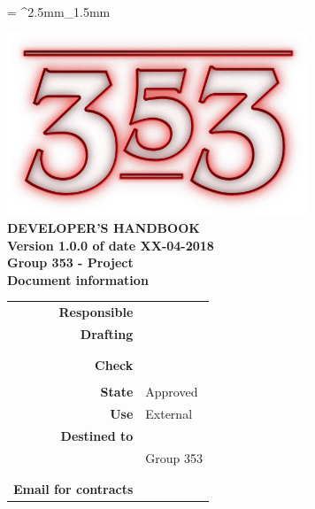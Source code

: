 \documentclass[openany, a4paper, 12pt]{report}
\begin{document}
	
	\tabulinesep = ^2.5mm_1.5mm
	
	\begin{titlepage}
		\centering
		\vfill
		{
			\bfseries
			\vskip2cm
			\includegraphics[width=9cm]{../../common/images/logo.png} \\
			\vfill
			\Huge{DEVELOPER'S HANDBOOK}\\
			\vfill
			\Large Version 1.0.0 of date XX-04-2018\\ 
			\large Group 353 - Project \progetto \\
			\vfill
			\normalsize Document information\\
			\begin{table}[htbp]
				\centering
				\renewcommand\arraystretch{1.2}
				\begin{tabular}{r|l}
					\hline
					\textbf{Responsible}	& \Parwinder \\
					
					\textbf{Drafting} 		& \Elena \\
											& \Gianluca \\
											& \Valentina \\
											
					\textbf{Check} 			& \Riccardo \\	
											& \Davide \\
											
					\textbf{State} 			& Approved\\
					\textbf{Use}			& External\\
					\textbf{Destined to}   	& \Proponente\\
										& Group 353\\
										& \Vardanega\\
										& \Cardin\\
					
					\textbf{Email for contracts}	& \mailgroup
				\end{tabular}
			\end{table}
			\vfill
		}    
	\end{titlepage}
	
	\renewcommand{\contentsname}{Index}
	\tableofcontents
	\renewcommand{\listtablename}{List of Tables}
	\listoftables
	\renewcommand{\listfigurename}{List of Figures}
	\listoffigures
	\newpage
	
	
	
	
	
	
	
	
	
\end{document}
